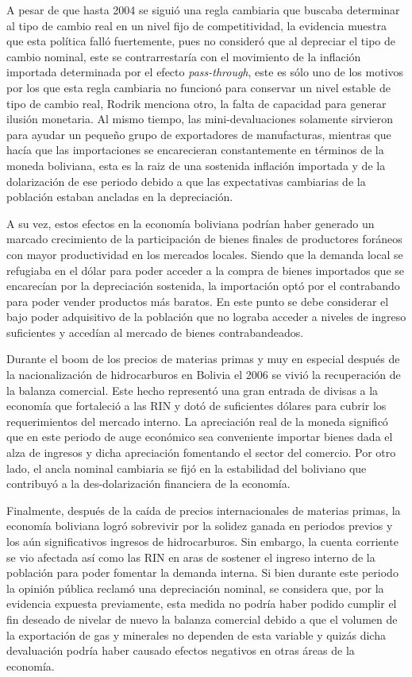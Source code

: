 \documentclass[12pt,letterpaper]{article}
\begin{document}
A pesar de que hasta 2004 se siguió una regla cambiaria que buscaba determinar al tipo de cambio real en un nivel fijo de competitividad, la evidencia muestra que esta política falló fuertemente, pues no consideró que al depreciar el tipo de cambio nominal, este se contrarrestaría con el movimiento de la inflación importada determinada por el efecto \emph{pass-through}, este es sólo uno de los motivos por los que esta regla cambiaria no funcionó para conservar un nivel estable de tipo de cambio real, Rodrik menciona otro, la falta de capacidad para generar ilusión monetaria. Al mismo tiempo, las mini-devaluaciones solamente sirvieron para ayudar un pequeño grupo de exportadores de manufacturas, mientras que hacía que las importaciones se encarecieran constantemente en términos de la moneda boliviana, esta es la raiz de una sostenida inflación importada y de la dolarización de ese periodo debido a que las expectativas cambiarias de la población estaban ancladas en la depreciación.

A su vez, estos efectos en la economía boliviana podrían haber generado un marcado crecimiento de la participación de bienes finales de productores foráneos con mayor productividad en los mercados locales. Siendo que la demanda local se refugiaba en el dólar para poder acceder a la compra de bienes importados que se encarecían por la depreciación sostenida, la importación optó por el contrabando para poder vender productos más baratos. En este punto se debe considerar el bajo poder adquisitivo de la población que no lograba acceder a niveles de ingreso suficientes y accedían al mercado de bienes contrabandeados.

Durante el boom de los precios de materias primas y muy en especial después de la nacionalización de hidrocarburos en Bolivia el 2006 se vivió la recuperación de la balanza comercial. Este hecho representó una gran entrada de divisas a la economía que fortaleció a las RIN y dotó de suficientes dólares para cubrir los requerimientos del mercado interno. La apreciación real de la moneda significó que en este periodo de auge económico sea conveniente importar bienes dada el alza de ingresos y dicha apreciación fomentando el sector del comercio. Por otro lado, el ancla nominal cambiaria se fijó en la estabilidad del boliviano que contribuyó a la des-dolarización financiera de la economía.

Finalmente, después de la caída de precios internacionales de materias primas, la economía boliviana logró sobrevivir por la solidez ganada en periodos previos y los aún significativos ingresos de hidrocarburos. Sin embargo, la cuenta corriente se vio afectada así como las RIN en aras de sostener el ingreso interno de la población para poder fomentar la demanda interna. Si bien durante este periodo la opinión pública reclamó una depreciación nominal, se considera que, por la evidencia expuesta previamente, esta medida no podría haber podido cumplir el fin deseado de nivelar de nuevo la balanza comercial debido a que el volumen de la exportación de gas y minerales no dependen de esta variable y quizás dicha devaluación podría haber causado efectos negativos en otras áreas de la economía.
\end{document}
